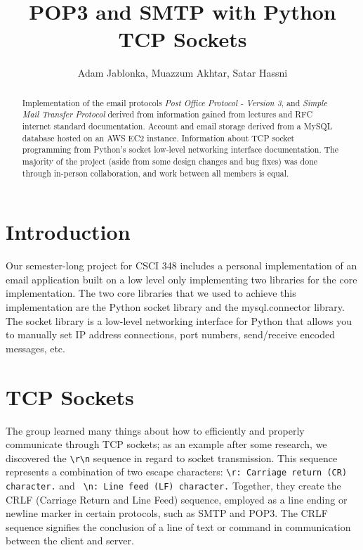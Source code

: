 \documentclass[12pt]{article}
\begin{document}
\title{POP3 and SMTP with Python TCP Sockets}
\author{Adam Jablonka, Muazzum Akhtar, Satar Hassni}
\maketitle

\begin{abstract}
    Implementation of the email protocols \emph{Post Office Protocol - Version 3}, and \emph{Simple Mail Transfer Protocol} derived from information gained from lectures and RFC internet standard documentation. Account and email storage derived from a MySQL database hosted on an AWS EC2 instance. Information about TCP socket programming from Python's socket low-level networking interface documentation. The majority of the project (aside from some design changes and bug fixes) was done through in-person collaboration, and work between all members is equal.
\end{abstract}

\section{Introduction}
Our semester-long project for CSCI 348 includes a personal implementation of an email application built on a low level only implementing two libraries for the core implementation. The two core libraries that we used to achieve this implementation are the Python socket library and the mysql.connector library. The socket library is a low-level networking interface for Python that allows you to manually set IP address connections, port numbers, send/receive encoded messages, etc.


\section{TCP Sockets}
The group learned many things about how to efficiently and properly communicate through TCP sockets; as an example after some research, we discovered the \texttt{\textbackslash r\textbackslash n} sequence in regard to socket transmission. This sequence represents a combination of two escape characters: \texttt{\textbackslash r: Carriage return (CR) character.} and \texttt{ \textbackslash n: Line feed (LF) character.} Together, they create the CRLF (Carriage Return and Line Feed) sequence, employed as a line ending or newline marker in certain protocols, such as SMTP and POP3. The CRLF sequence signifies the conclusion of a line of text or command in communication between the client and server.
\end{document}
